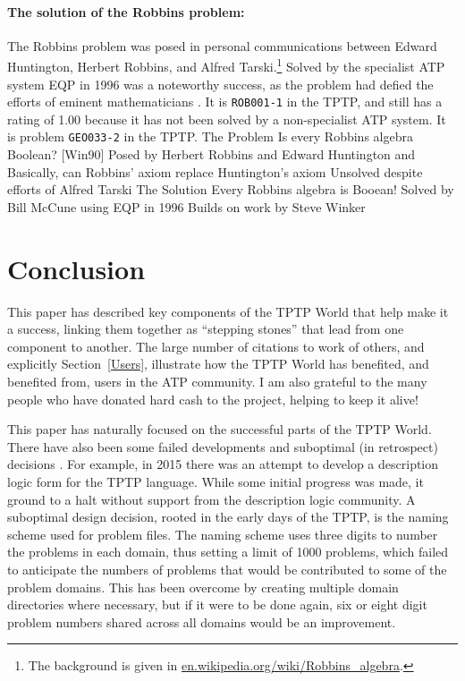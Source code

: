 \documentclass[runningheads]{llncs}
\begin{document}
\paragraph{The solution of the Robbins problem:}
The Robbins problem was posed in personal communications between Edward Huntington,
Herbert Robbins, and Alfred Tarski.\footnote{%
The background is given in
\href{https://en.wikipedia.org/wiki/Robbins_algebra}{en.wikipedia.org/wiki/Robbins\_algebra}.}
Solved by the specialist ATP system EQP \cite{McC97}
in 1996 was a noteworthy success, as the problem had defied the efforts of eminent
mathematicians \cite{HMT71}.
It is {\tt ROB001-1} in the TPTP, and still has a rating of 1.00 because
it has not been solved by a non-specialist ATP system.
It is problem {\tt GEO033-2} in the TPTP.
The Problem
Is every Robbins algebra Boolean? [Win90]
Posed by Herbert Robbins and Edward Huntington and
Basically, can Robbins' axiom replace Huntington's axiom
Unsolved despite efforts of Alfred Tarski
The Solution
Every Robbins algebra is Booean!
Solved by Bill McCune using EQP in 1996
Builds on work by Steve Winker

\section{Conclusion}
\label{Conclusion}

This paper has described key components of the TPTP World that help make it a success,
linking them together as ``stepping stones'' that lead from one component to another.
The large number of citations to work of others, and explicitly Section~\ref{Users}, 
illustrate how the TPTP World has benefited, and benefited from, users in the ATP community.
I am also grateful to the many people who have donated hard cash to the project, helping
to keep it alive!

This paper has naturally focused on the successful parts of the TPTP World.
There have also been some failed developments and suboptimal (in retrospect) decisions \frownie{}.
For example, in 2015 there was an attempt to develop a description logic form for the TPTP 
language. 
While some initial progress was made, it ground to a halt without support from the description 
logic community.
A suboptimal design decision, rooted in the early days of the TPTP, is the naming scheme used for 
problem files. 
The naming scheme uses three digits to number the problems in each domain, thus setting a limit 
of 1000 problems, which failed to anticipate the numbers of problems that would be contributed 
to some of the problem domains.
This has been overcome by creating multiple domain directories where necessary, but if it were 
to be done again, six or eight digit problem numbers shared across all domains would be an 
improvement.
\end{document}
